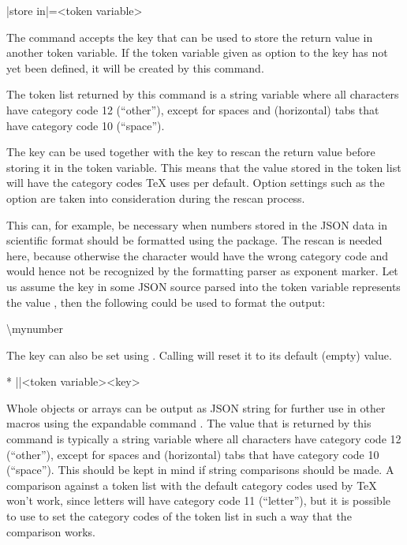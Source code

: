 \documentclass[a4paper]{article}
\begin{document}
{{\begin{macrodef}
|store in|={<token variable>}
\end{macrodef}
The command \macro{\JSONParseValue} accepts the key  that can be used to store the return value in another token variable. If the token variable given as option to the  key has not yet been defined, it will be created by this command.

The token list returned by this command is a string variable where all characters have category code 12 (``other''), except for spaces and (horizontal) tabs that have category code 10 (``space'').

The key  can be used together with the key  to rescan the return value before storing it in the token variable. This means that the value stored in the token list will have the category codes TeX uses per default. Option settings such as the  option are taken into consideration during the rescan process.

This can, for example, be necessary when numbers stored in the JSON data in scientific format should be formatted using the  package. The rescan is needed here, because otherwise the character  would have the wrong category code and would hence not be recognized by the formatting parser as exponent marker. Let us assume the key  in some JSON source parsed into the token variable \macro{\myJSONnumber} represents the value , then the following could be used to format the output:

\begin{codeexamplecolumns}
\num{\mynumber}
\end{codeexamplecolumns}

The key  can also be set using \macro{\JSONParseSet}. Calling  will reset it to its default (empty) value.

\begin{macrodef}*
|\JSONParseExpandableValue|{<token variable>}{<key>}
\end{macrodef}
Whole objects or arrays can be output as JSON string for further use in other macros using the expandable command \macro{\JSONParseExpandableValue}. The value that is returned by this command is typically a string variable where all characters have category code 12 (``other''), except for spaces and (horizontal) tabs that have category code 10 (``space''). This should be kept in mind if string comparisons should be made. A comparison against a token list with the default category codes used by TeX won't work, since letters will have category code 11 (``letter''), but it is possible to use \macro{\detokenize} to set the category codes of the token list in such a way that the comparison works.

}}
\end{document}
